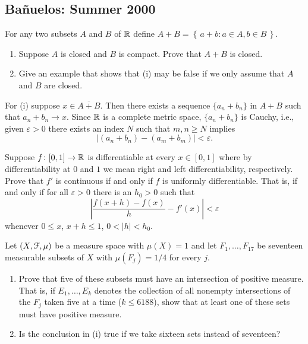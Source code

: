 \subsection{Bañuelos: Summer 2000}
\setcounter{exercise}{0}
\setcounter{equation}{0}

\begin{problem}
  For any two subsets $A$ and $B$ of $\mathbb{R}$ define $A+B=\left\{\,a+b:a\in
    A,b\in B\,\right\}$.
  \begin{enumerate}[label=(\roman*),noitemsep]
  \item Suppose $A$ is closed and $B$ is compact. Prove that $A+B$ is
    closed.
  \item Give an example that shows that (i) may be false if we only assume
    that $A$ and $B$ are closed.
  \end{enumerate}
\end{problem}
\begin{solution}
  For (i) suppose $x\in\overline{A+B}$. Then there exists a sequence
  $\{a_n+b_n\}$ in $A+B$ such that $a_n+b_n\to x$. Since $\mathbb{R}$ is a
  complete metric space, $\{a_n+b_n\}$ is Cauchy, i.e., given
  $\varepsilon>0$ there exists an index $N$ such that $m,n\geq N$ implies
  \[
    |(a_n+b_n)-(a_m+b_m)|<\varepsilon.
  \]
\end{solution}

\begin{problem}
  Suppose $f\colon[0,1]\to\mathbb{R}$ is differentiable at every $x\in[0,1]$
  where by differentiability at $0$ and $1$ we mean right and left
  differentiability, respectively. Prove that $f'$ is continuous if and
  only if $f$ is uniformly differentiable. That is, if and only if for all
  $\varepsilon>0$ there is an $h_0>0$ such that
  \[
    \left|\frac{f(x+h)-f(x)}{h}-f'(x)\right|<\varepsilon
  \]
  whenever $0\leq x$, $x+h\leq 1$, $0<|h|<h_0$.
\end{problem}
\begin{solution}
\end{solution}

\begin{problem}
  Let $(X,\mathcal{F},\mu)$ be a measure space with $\mu(X)=1$ and let
  $F_1,\ldots,F_{17}$ be seventeen measurable subsets of $X$ with
  $\mu(F_j)=1/4$ for every $j$.
  \begin{enumerate}[label=(\roman*),noitemsep]
  \item Prove that five of these subsets must have an intersection of
    positive measure. That is, if $E_1,\ldots,E_k$ denotes the collection
    of all nonempty intersections of the $F_j$ taken five at a time ($k\leq
    6188$), show that at least one of these sets must have positive
    measure.
  \item Is the conclusion in (i) true if we take sixteen sets instead of
    seventeen?
  \end{enumerate}
\end{problem}
\begin{solution}
\end{solution}

